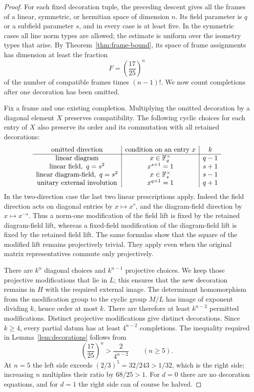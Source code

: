 \begin{proof}
For each fixed decoration tuple, the preceding descent gives all the
frames of a linear, symmetric, or hermitian space of dimension $n$.
Its field parameter is $q$ or a subfield parameter $s$, and in every
case is at least five.  In the symmetric cases all line norm types are
allowed; the estimate is uniform over the isometry types that arise.
By Theorem~\ref{thm:frame-bound}, its space of
frame assignments has dimension at least the fraction
\[
 F=\left(\frac{17}{25}\right)^n
\]
of the number of compatible frames times $(n-1)!$.
We now count completions after one decoration has been omitted.

Fix a frame and one existing completion.  Multiplying the omitted
decoration by a diagonal element $X$ preserves compatibility.  The
following cyclic choices for each entry of $X$ also preserve its order
and its commutation with all retained decorations:
\[
\begin{array}{c|c|c}
\text{omitted direction}&\text{condition on an entry }x&k\\
\hline
\text{linear diagram}&x\in\mathbb F_q^\times&q-1\\
\text{linear field},\ q=s^2&x^{s+1}=1&s+1\\
\text{linear diagram-field},\ q=s^2&x\in\mathbb F_s^\times&s-1\\
\text{unitary external involution}&x^{q+1}=1&q+1
\end{array}
\]
In the two-direction case the last two linear prescriptions apply.
Indeed the field direction acts on diagonal entries by $x\mapsto x^s$,
and the diagram-field direction by $x\mapsto x^{-s}$.  Thus a norm-one
modification of the field lift is fixed by the retained diagram-field
lift, whereas a fixed-field modification of the diagram-field lift is
fixed by the retained field lift.  The same formulas show that the
square of the modified lift remains projectively trivial.  They apply
even when the original matrix representatives commute only projectively.

There are $k^n$ diagonal choices and $k^{n-1}$ projective choices.
We keep those projective modifications that lie in $L$; this ensures
that the new decoration remains in $H$ with the required external image.
The determinant homomorphism from the modification group to the cyclic
group $M/L$ has image of exponent dividing $k$, hence order at most $k$.
There are therefore at least $k^{n-2}$ permitted modifications.
Distinct projective modifications give distinct decorations.  Since
$k\ge4$, every partial datum has at least $4^{n-2}$ completions.
The inequality required in Lemma~\ref{lem:decorations} follows from
\begin{equation}\label{eq:linear-completion-inequality}
 \left(\frac{17}{25}\right)^n>\frac{2}{4^{n-2}}
 \qquad(n\ge5).
\end{equation}
At $n=5$ the left side exceeds $(2/3)^5=32/243>1/32$, which is the
right side; increasing $n$ multiplies their ratio by $68/25>1$.
For $d=0$ there are no decoration equations, and for $d=1$ the right
side can of course be halved.


\end{proof}

